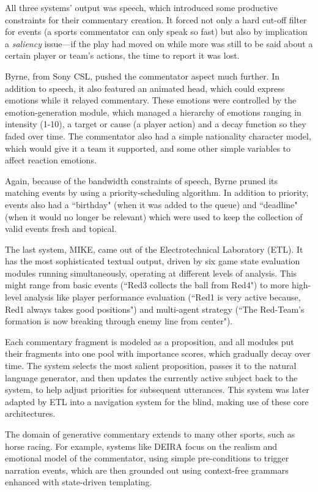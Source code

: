 All three systems' output was speech, which introduced some productive constraints for their commentary creation. It forced not only a hard cut-off filter for events (a sports commentator can only speak so fast) but also by implication a \textit{saliency} issue---if the play had moved on while more was still to be said about a certain player or team's actions, the time to report it was lost.

Byrne, from Sony CSL, pushed the commentator aspect much further. In addition to speech, it also featured an animated head, which could express emotions while it relayed commentary. These emotions were controlled by the emotion-generation module, which managed a hierarchy of emotions ranging in intensity (1-10), a target or cause (a player action) and a decay function so they faded over time. The commentator also had a simple nationality character model, which would give it a team it supported, and some other simple variables to affect reaction emotions.

Again, because of the bandwidth constraints of speech, Byrne pruned its matching events by using a priority-scheduling algorithm. In addition to priority, events also had a ``birthday" (when it was added to the queue) and ``deadline" (when it would no longer be relevant) which were used to keep the collection of valid events fresh and topical.

The last system, MIKE, came out of the Electrotechnical Laboratory (ETL). It has the most sophisticated textual output, driven by six game state evaluation modules running simultaneously, operating at different levels of analysis. This might range from basic events (``Red3 collects the ball from Red4") to more high-level analysis like player performance evaluation (``Red1 is very active because, Red1 always takes good positions") and multi-agent strategy (``The Red-Team's formation is now breaking through enemy line from center").

Each commentary fragment is modeled as a proposition, and all modules put their fragments into one pool with importance scores, which gradually decay over time. The system selects the most salient proposition, passes it to the natural language generator, and then updates the currently active subject back to the system, to help adjust priorities for subsequent utterances. This system was later adapted by ETL into a navigation system for the blind, making use of these core architectures.

The domain of generative commentary extends to many other sports, such as horse racing. For example, systems like DEIRA \cite{deira} focus on the realism and emotional model of the commentator, using simple pre-conditions to trigger narration events, which are then grounded out using context-free grammars enhanced with state-driven templating.

